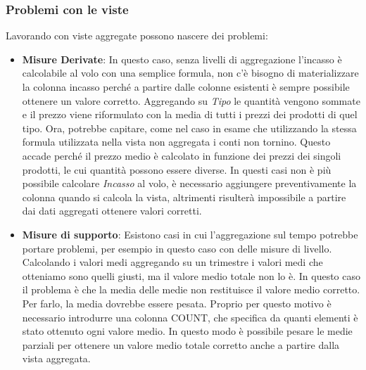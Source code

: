 \subsubsection{Problemi con le viste}
Lavorando con viste aggregate possono nascere dei problemi:
\begin{itemize}
	\item \textbf{Misure Derivate}: In questo caso, senza livelli di aggregazione l'incasso è calcolabile al volo con una semplice formula, non c'è bisogno di materializzare la colonna incasso perché a partire dalle colonne esistenti è sempre possibile ottenere un valore corretto.\newline
	Aggregando su \textit{Tipo} le quantità vengono sommate e il prezzo viene riformulato con la media di tutti i prezzi dei prodotti di quel tipo. Ora, potrebbe capitare, come nel caso in esame che utilizzando la stessa formula utilizzata nella vista non aggregata i conti non tornino. Questo accade perché il prezzo medio è calcolato in funzione dei prezzi dei singoli prodotti, le cui quantità possono essere diverse.\newline
	In questi casi non è più possibile calcolare \textit{Incasso} al volo, è necessario aggiungere preventivamente la colonna quando si calcola la vista, altrimenti risulterà impossibile a partire dai dati aggregati ottenere valori corretti.
	\item \textbf{Misure di supporto}: Esistono casi in cui l'aggregazione sul tempo potrebbe portare problemi, per esempio in questo caso con delle misure di livello. Calcolando i valori medi aggregando su un trimestre i valori medi che otteniamo sono quelli giusti, ma il valore medio totale non lo è. In questo caso il problema è che la media delle medie non restituisce il valore medio corretto. Per farlo, la media dovrebbe essere pesata. Proprio per questo motivo è necessario introdurre una colonna COUNT, che specifica da quanti elementi è stato ottenuto ogni valore medio. In questo modo è possibile pesare le medie parziali per ottenere un valore medio totale corretto anche a partire dalla vista aggregata.
\end{itemize}
